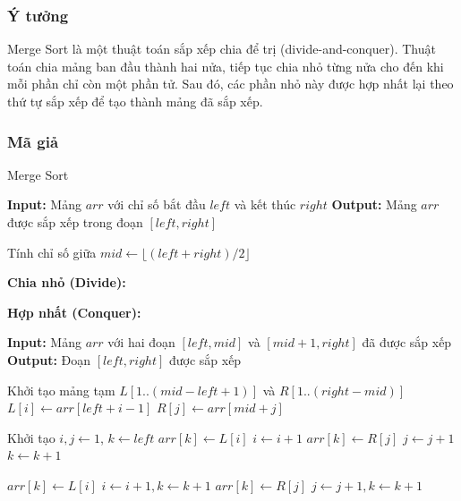 \subsubsection{Ý tưởng}
Merge Sort là một thuật toán sắp xếp chia để trị (divide-and-conquer). Thuật toán chia mảng ban đầu thành hai nửa, tiếp tục chia nhỏ từng nửa cho đến khi mỗi phần chỉ còn một phần tử. Sau đó, các phần nhỏ này được hợp nhất lại theo thứ tự sắp xếp để tạo thành mảng đã sắp xếp. \cite{drozdek2023}

\subsubsection{Mã giả}

\begin{algorithm}[H]
\caption{Merge Sort}
\begin{algorithmic}[1]
    \State \textbf{Input:} Mảng $arr$ với chỉ số bắt đầu $left$ và kết thúc $right$
    \State \textbf{Output:} Mảng $arr$ được sắp xếp trong đoạn $[left, right]$
    
        \State Tính chỉ số giữa $mid \gets \lfloor (left + right) / 2 \rfloor$
        
        \State \textbf{Chia nhỏ (Divide):}
        \State {} 
        \State {} 
        
        \State \textbf{Hợp nhất (Conquer):}
        \State {} 
    \EndIf
\EndProcedure

    \State \textbf{Input:} Mảng $arr$ với hai đoạn $[left, mid]$ và $[mid+1, right]$ đã được sắp xếp
    \State \textbf{Output:} Đoạn $[left, right]$ được sắp xếp
    
    \State Khởi tạo mảng tạm $L[1..(mid-left+1)]$ và $R[1..(right-mid)]$
        \State $L[i] \gets arr[left + i - 1]$
    \EndFor
        \State $R[j] \gets arr[mid + j]$
    \EndFor
    
    \State Khởi tạo $i, j \gets 1$, $k \gets left$
            \State $arr[k] \gets L[i]$
            \State $i \gets i + 1$
        \Else
            \State $arr[k] \gets R[j]$
            \State $j \gets j + 1$
        \EndIf
        \State $k \gets k + 1$
    \EndWhile
    
        \State $arr[k] \gets L[i]$
        \State $i \gets i + 1, k \gets k + 1$
    \EndWhile
        \State $arr[k] \gets R[j]$
        \State $j \gets j + 1, k \gets k + 1$
    \EndWhile
\EndProcedure
\end{algorithmic}
\end{algorithm}

